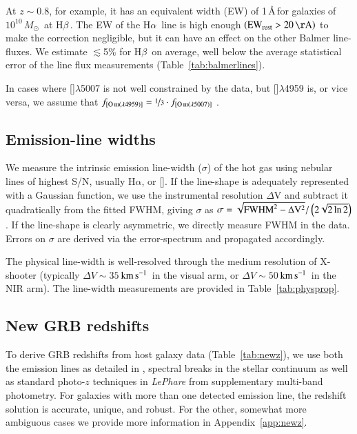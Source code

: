 \documentclass[traditabstract, longauth]{aa}
\newcommand{\kms}{$\rm{km\,s^{-1}}$}
\newcommand{\hb}{H$\beta$}
\newcommand{\ha}{H$\alpha$}
\newcommand{\oiii}{[\ion{O}{iii}]}
\newcommand{\Msun}{$M_\odot$}
\begin{document}
At $z\sim0.8$, for example, it has an equivalent width (EW) of 1\,\AA\,for galaxies of $10^{10}$\,\Msun\, at \hb\,\citep{2011ApJ...730..137Z}. The EW of the \ha\, line is high enough $(\rm{EW}_{\rm{rest}} > 20\,\AA)$ to make the correction negligible, but it can have an effect on the other Balmer line-fluxes. We estimate $\lesssim$5\% for \hb\, on average, well below the average statistical error of the line flux measurements (Table~\ref{tab:balmerlines}).
 
In cases where \oiii$\lambda$5007 is not well constrained by the data, but \oiii$\lambda$4959 is, or vice versa, we assume that $f_{[\ion{O}{iii}(\lambda 4959)]} = \nicefrac{1}{3} \cdot f_{[\ion{O}{iii}(\lambda 5007)]}$ \citep{2000MNRAS.312..813S}.

\subsection{Emission-line widths}

We measure the intrinsic emission line-width ($\sigma$) of the hot gas using nebular lines of highest S/N, usually \ha, or \oiii. If the line-shape is adequately represented with a Gaussian function, we use the instrumental resolution $\Delta$V and subtract it quadratically from the fitted FWHM, giving $\sigma$ as $\sigma = \sqrt{\rm{FWHM}^2 - \Delta V^2} / \left(2\sqrt{2\ln 2}\right)$. If the line-shape is clearly asymmetric, we directly measure FWHM in the data. Errors on $\sigma$ are derived via the error-spectrum and propagated accordingly.

The physical line-width is well-resolved through the medium resolution of X-shooter (typically $\Delta V \sim 35\,$\kms\, in the visual arm, or $\Delta V \sim 50\,$\kms\, in the NIR arm). The line-width measurements are provided in Table~\ref{tab:physprop}.



\subsection{New GRB redshifts}
\label{sec:newzs}

To derive GRB redshifts from host galaxy data (Table~\ref{tab:newz}), we use both the emission lines as detailed in \citet{2012ApJ...758...46K}, spectral breaks in the stellar continuum \citep{2012ApJ...752...62J} as well as standard photo-$z$ techniques in \textit{LePhare} \citep{1999MNRAS.310..540A, 2006A&A...457..841I} from supplementary multi-band photometry. For galaxies with more than one detected emission line, the redshift solution is accurate, unique, and robust. For the other, somewhat more ambiguous cases we provide more information in Appendix~\ref{app:newz}. 
\end{document}
